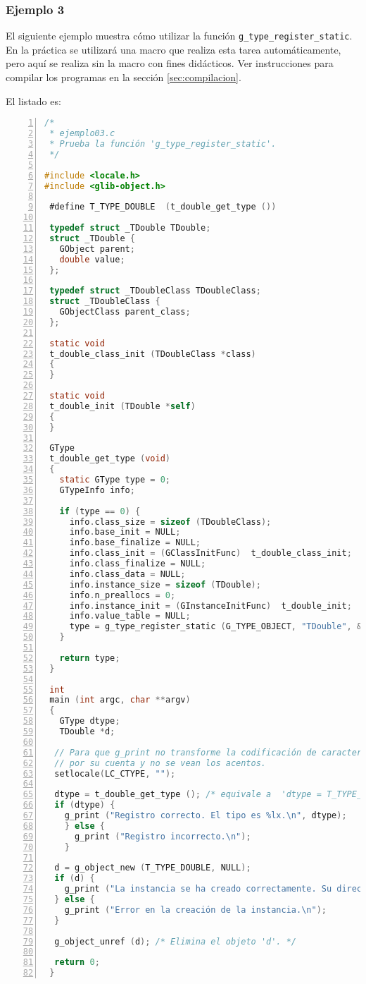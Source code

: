 \subsubsection{Ejemplo 3}
El siguiente ejemplo muestra cómo utilizar la función \texttt{g\_type\_register\_static}.
En la práctica se utilizará una macro que realiza esta tarea automáticamente, pero aquí se realiza sin
la macro con fines didácticos.
Ver instrucciones para compilar los programas en la sección \ref{sec:compilacion}.

El listado es:
\begin{lstlisting}[language=C, numbers=left]
/*
 * ejemplo03.c
 * Prueba la función 'g_type_register_static'.
 */

#include <locale.h>
#include <glib-object.h>
 
 #define T_TYPE_DOUBLE  (t_double_get_type ())
 
 typedef struct _TDouble TDouble;
 struct _TDouble {
   GObject parent;
   double value;
 };
 
 typedef struct _TDoubleClass TDoubleClass;
 struct _TDoubleClass {
   GObjectClass parent_class;
 };
 
 static void
 t_double_class_init (TDoubleClass *class)
 {
 }
 
 static void
 t_double_init (TDouble *self)
 {
 }
 
 GType
 t_double_get_type (void)
 {
   static GType type = 0;
   GTypeInfo info;
 
   if (type == 0) {
     info.class_size = sizeof (TDoubleClass);
     info.base_init = NULL;
     info.base_finalize = NULL;
     info.class_init = (GClassInitFunc)  t_double_class_init;
     info.class_finalize = NULL;
     info.class_data = NULL;
     info.instance_size = sizeof (TDouble);
     info.n_preallocs = 0;
     info.instance_init = (GInstanceInitFunc)  t_double_init;
     info.value_table = NULL;
     type = g_type_register_static (G_TYPE_OBJECT, "TDouble", &info, 0);
   }
   
   return type;
 }
 
 int
 main (int argc, char **argv)
 {
   GType dtype;
   TDouble *d;

  // Para que g_print no transforme la codificación de caracteres
  // por su cuenta y no se vean los acentos.
  setlocale(LC_CTYPE, "");
   
  dtype = t_double_get_type (); /* equivale a  'dtype = T_TYPE_DOUBLE' */
  if (dtype) {
    g_print ("Registro correcto. El tipo es %lx.\n", dtype);
    } else {
      g_print ("Registro incorrecto.\n");
    }
 
  d = g_object_new (T_TYPE_DOUBLE, NULL);
  if (d) {
    g_print ("La instancia se ha creado correctamente. Su dirección es %p.\n", d);
  } else {
    g_print ("Error en la creación de la instancia.\n");
  }
  
  g_object_unref (d); /* Elimina el objeto 'd'. */
  
  return 0;
 }
 \end{lstlisting}

